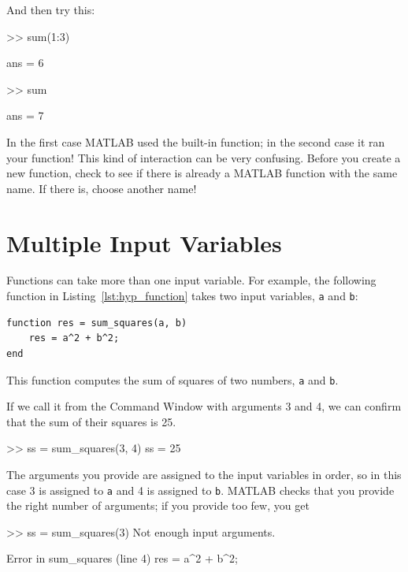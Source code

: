 \documentclass[../../book.tex]{subfiles}
\begin{document}
And then try this:

\begin{code}
>> sum(1:3)

ans = 6

>> sum

ans = 7
\end{code}

In the first case MATLAB used the built-in function; in the second
case it ran your function!  This kind of interaction can be very
confusing.  Before you create a new function, check to see if there is
already a MATLAB function with the same name.  If there is, choose
another name!

\section{Multiple Input Variables}
\label{hypotenuse}


Functions can take more than one input variable.
For example, the following function in Listing~\ref{lst:hyp_function} takes two input variables,
\lstinline{a} and \lstinline{b}:

\begin{lstlisting}[caption={A function that computes the sum of squares of two numbers}, label={lst:hyp_function}]
function res = sum_squares(a, b)
    res = a^2 + b^2;
end
\end{lstlisting}

This function computes the sum of squares of two numbers, \lstinline{a}
and \lstinline{b}.

If we call it from the Command Window with arguments 3 and 4, we can
confirm that the sum of their squares is 25.

\begin{code}
>> ss = sum_squares(3, 4)
ss = 25
\end{code}

The arguments you provide are assigned to the input variables in
order, so in this case 3 is assigned to \lstinline{a} and 4 is assigned to
\lstinline{b}.  MATLAB checks that you provide the right number of arguments;
if you provide too few, you get

\begin{code}
>> ss = sum_squares(3)
Not enough input arguments.

Error in sum_squares (line 4)
    res = a^2 + b^2;
\end{code}
\end{document}
